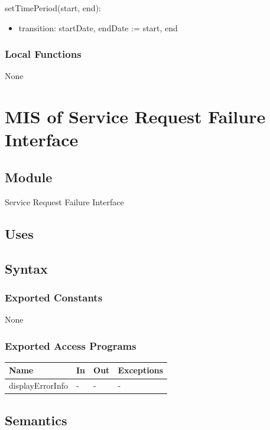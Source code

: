 \documentclass[12pt, titlepage]{article}
\begin{document}
\noindent setTimePeriod(start, end):
\begin{itemize}
\item transition: startDate, endDate := start, end 
\end{itemize}

\subsubsection{Local Functions}
None

\section{MIS of Service Request Failure Interface} \label{srfi}

\subsection{Module}

Service Request Failure Interface

\subsection{Uses}


\subsection{Syntax}

\subsubsection{Exported Constants}
None
\subsubsection{Exported Access Programs}

\begin{center}
\begin{tabular}{p{3cm} p{4cm} p{4cm} p{2cm}}
\hline
\textbf{Name} & \textbf{In} & \textbf{Out} & \textbf{Exceptions} \\
\hline
displayErrorInfo & - & - & - \\
\hline
\end{tabular}
\end{center}

\subsection{Semantics}
\end{document}
